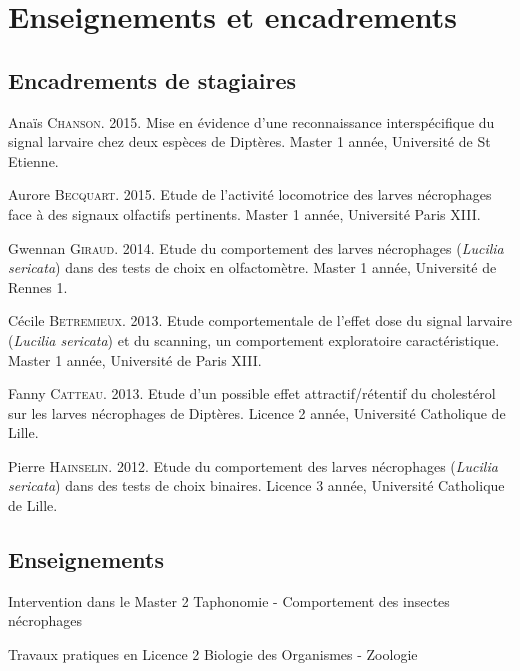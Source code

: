 
\chapter{Enseignements et encadrements} %

\label{Annexes3} %


\section{Encadrements de stagiaires}

Anaïs \textsc{Chanson}. 2015. Mise en évidence d'une reconnaissance interspécifique du signal larvaire chez deux espèces de Diptères. Master 1 année, Université de St Etienne.

Aurore \textsc{Becquart}. 2015. Etude de l'activité locomotrice des larves nécrophages face à des signaux olfactifs pertinents. Master 1 année, Université Paris XIII.

Gwennan \textsc{Giraud}. 2014. Etude du comportement des larves nécrophages (\textit{Lucilia sericata}) dans des tests de choix en olfactomètre. Master 1 année, Université de Rennes 1.

Cécile \textsc{Betremieux}. 2013. Etude comportementale de l'effet dose du signal larvaire (\textit{Lucilia sericata}) et du scanning, un comportement exploratoire caractéristique. Master 1 année, Université de Paris XIII.

Fanny \textsc{Catteau}. 2013. Etude d'un possible effet attractif/rétentif du cholestérol sur les larves nécrophages de Diptères. Licence 2 année, Université Catholique de Lille.

Pierre \textsc{Hainselin}. 2012. Etude du comportement des larves nécrophages (\textit{Lucilia sericata}) dans des tests de choix binaires. Licence 3 année, Université Catholique de Lille.

\section{Enseignements}

Intervention dans le Master 2 Taphonomie - Comportement des insectes nécrophages

Travaux pratiques en Licence 2 Biologie des Organismes - Zoologie
